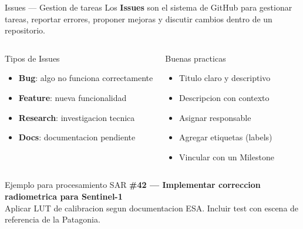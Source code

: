 \documentclass[aspectratio=169]{beamer}
\begin{document}
\begin{frame}{Issues --- Gestion de tareas}
  Los \textbf{Issues} son el sistema de GitHub para gestionar tareas, reportar errores, proponer mejoras y discutir cambios dentro de un repositorio.

  \vspace{0.3cm}

  \begin{columns}
    \begin{block}{Tipos de Issues}
      \begin{itemize}
        \item \textbf{Bug}: algo no funciona correctamente
        \item \textbf{Feature}: nueva funcionalidad
        \item \textbf{Research}: investigacion tecnica
        \item \textbf{Docs}: documentacion pendiente
      \end{itemize}
    \end{block}

    \begin{block}{Buenas practicas}
      \begin{itemize}
        \item Titulo claro y descriptivo
        \item Descripcion con contexto
        \item Asignar responsable
        \item Agregar etiquetas (labels)
        \item Vincular con un Milestone
      \end{itemize}
    \end{block}
  \end{columns}

  \vspace{0.3cm}

  \begin{exampleblock}{Ejemplo para procesamiento SAR}
    \textbf{\#42 --- Implementar correccion radiometrica para Sentinel-1}\\
    \small Aplicar LUT de calibracion segun documentacion ESA. Incluir test con escena de referencia de la Patagonia.
  \end{exampleblock}
\end{frame}
\end{document}
